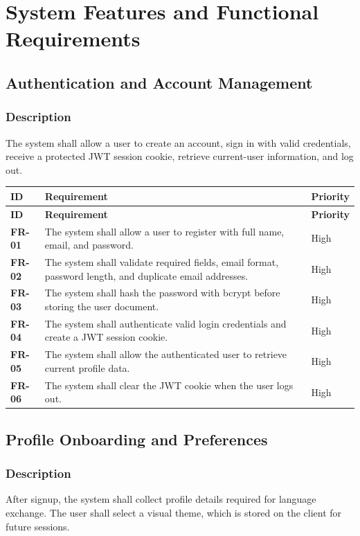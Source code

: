 \documentclass[12pt,a4paper]{report}
\newcommand{\req}[3]{\textbf{#1} & #2 & #3 \\ \hline}
\begin{document}
\chapter{System Features and Functional Requirements}
\section{Authentication and Account Management}
\subsection{Description}
The system shall allow a user to create an account, sign in with valid credentials, receive a protected JWT session cookie, retrieve current-user information, and log out.

\begin{longtable}{|p{1.0in}|p{3.4in}|p{1.5in}|}
\hline
\rowcolor{gray!25}\textbf{ID} & \textbf{Requirement} & \textbf{Priority} \\ \hline
\endfirsthead
\hline
\rowcolor{gray!25}\textbf{ID} & \textbf{Requirement} & \textbf{Priority} \\ \hline
\endhead
\req{FR-01}{The system shall allow a user to register with full name, email, and password.}{High}
\req{FR-02}{The system shall validate required fields, email format, password length, and duplicate email addresses.}{High}
\req{FR-03}{The system shall hash the password with bcrypt before storing the user document.}{High}
\req{FR-04}{The system shall authenticate valid login credentials and create a JWT session cookie.}{High}
\req{FR-05}{The system shall allow the authenticated user to retrieve current profile data.}{High}
\req{FR-06}{The system shall clear the JWT cookie when the user logs out.}{High}
\end{longtable}

\section{Profile Onboarding and Preferences}
\subsection{Description}
After signup, the system shall collect profile details required for language exchange. The user shall select a visual theme, which is stored on the client for future sessions.
\end{document}
